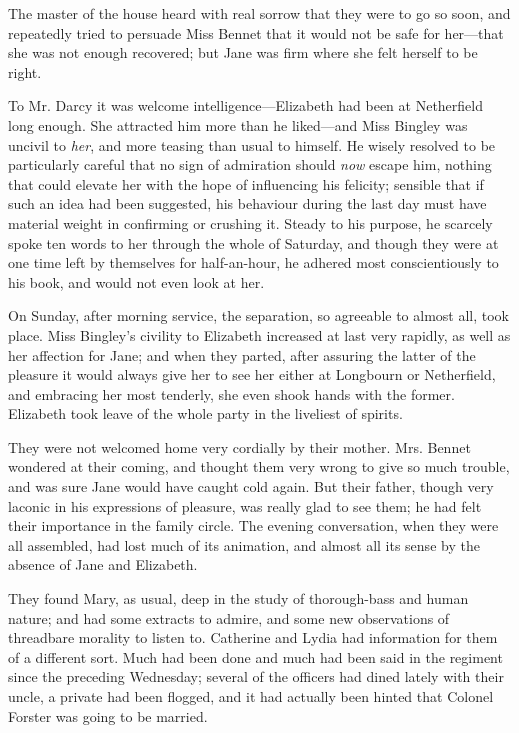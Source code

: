 The master of the house heard with real sorrow that they were to go so soon, and repeatedly tried to persuade Miss Bennet that it would not be safe for her---that she was not enough recovered; but Jane was firm where she felt herself to be right.

To Mr. Darcy it was welcome intelligence---Elizabeth had been at Netherfield long enough. She attracted him more than he liked---and Miss Bingley was uncivil to {\em her}, and more teasing than usual to himself. He wisely resolved to be particularly careful that no sign of admiration should {\em now} escape him, nothing that could elevate her with the hope of influencing his felicity; sensible that if such an idea had been suggested, his behaviour during the last day must have material weight in confirming or crushing it. Steady to his purpose, he scarcely spoke ten words to her through the whole of Saturday, and though they were at one time left by themselves for half-an-hour, he adhered most conscientiously to his book, and would not even look at her.

On Sunday, after morning service, the separation, so agreeable to almost all, took place. Miss Bingley's civility to Elizabeth increased at last very rapidly, as well as her affection for Jane; and when they parted, after assuring the latter of the pleasure it would always give her to see her either at Longbourn or Netherfield, and embracing her most tenderly, she even shook hands with the former. Elizabeth took leave of the whole party in the liveliest of spirits.

They were not welcomed home very cordially by their mother. Mrs. Bennet wondered at their coming, and thought them very wrong to give so much trouble, and was sure Jane would have caught cold again. But their father, though very laconic in his expressions of pleasure, was really glad to see them; he had felt their importance in the family circle. The evening conversation, when they were all assembled, had lost much of its animation, and almost all its sense by the absence of Jane and Elizabeth.

They found Mary, as usual, deep in the study of thorough-bass and human nature; and had some extracts to admire, and some new observations of threadbare morality to listen to. Catherine and Lydia had information for them of a different sort. Much had been done and much had been said in the regiment since the preceding Wednesday; several of the officers had dined lately with their uncle, a private had been flogged, and it had actually been hinted that Colonel Forster was going to be married.

